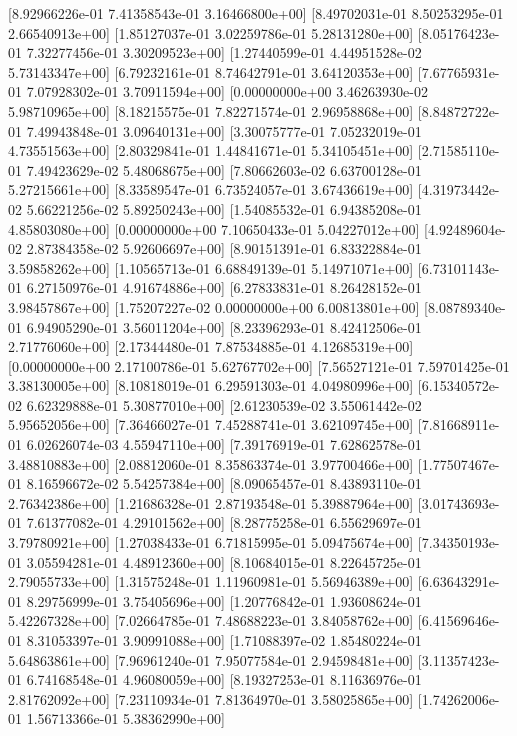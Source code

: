  [8.92966226e-01 7.41358543e-01 3.16466800e+00]
 [8.49702031e-01 8.50253295e-01 2.66540913e+00]
 [1.85127037e-01 3.02259786e-01 5.28131280e+00]
 [8.05176423e-01 7.32277456e-01 3.30209523e+00]
 [1.27440599e-01 4.44951528e-02 5.73143347e+00]
 [6.79232161e-01 8.74642791e-01 3.64120353e+00]
 [7.67765931e-01 7.07928302e-01 3.70911594e+00]
 [0.00000000e+00 3.46263930e-02 5.98710965e+00]
 [8.18215575e-01 7.82271574e-01 2.96958868e+00]
 [8.84872722e-01 7.49943848e-01 3.09640131e+00]
 [3.30075777e-01 7.05232019e-01 4.73551563e+00]
 [2.80329841e-01 1.44841671e-01 5.34105451e+00]
 [2.71585110e-01 7.49423629e-02 5.48068675e+00]
 [7.80662603e-02 6.63700128e-01 5.27215661e+00]
 [8.33589547e-01 6.73524057e-01 3.67436619e+00]
 [4.31973442e-02 5.66221256e-02 5.89250243e+00]
 [1.54085532e-01 6.94385208e-01 4.85803080e+00]
 [0.00000000e+00 7.10650433e-01 5.04227012e+00]
 [4.92489604e-02 2.87384358e-02 5.92606697e+00]
 [8.90151391e-01 6.83322884e-01 3.59858262e+00]
 [1.10565713e-01 6.68849139e-01 5.14971071e+00]
 [6.73101143e-01 6.27150976e-01 4.91674886e+00]
 [6.27833831e-01 8.26428152e-01 3.98457867e+00]
 [1.75207227e-02 0.00000000e+00 6.00813801e+00]
 [8.08789340e-01 6.94905290e-01 3.56011204e+00]
 [8.23396293e-01 8.42412506e-01 2.71776060e+00]
 [2.17344480e-01 7.87534885e-01 4.12685319e+00]
 [0.00000000e+00 2.17100786e-01 5.62767702e+00]
 [7.56527121e-01 7.59701425e-01 3.38130005e+00]
 [8.10818019e-01 6.29591303e-01 4.04980996e+00]
 [6.15340572e-02 6.62329888e-01 5.30877010e+00]
 [2.61230539e-02 3.55061442e-02 5.95652056e+00]
 [7.36466027e-01 7.45288741e-01 3.62109745e+00]
 [7.81668911e-01 6.02626074e-03 4.55947110e+00]
 [7.39176919e-01 7.62862578e-01 3.48810883e+00]
 [2.08812060e-01 8.35863374e-01 3.97700466e+00]
 [1.77507467e-01 8.16596672e-02 5.54257384e+00]
 [8.09065457e-01 8.43893110e-01 2.76342386e+00]
 [1.21686328e-01 2.87193548e-01 5.39887964e+00]
 [3.01743693e-01 7.61377082e-01 4.29101562e+00]
 [8.28775258e-01 6.55629697e-01 3.79780921e+00]
 [1.27038433e-01 6.71815995e-01 5.09475674e+00]
 [7.34350193e-01 3.05594281e-01 4.48912360e+00]
 [8.10684015e-01 8.22645725e-01 2.79055733e+00]
 [1.31575248e-01 1.11960981e-01 5.56946389e+00]
 [6.63643291e-01 8.29756999e-01 3.75405696e+00]
 [1.20776842e-01 1.93608624e-01 5.42267328e+00]
 [7.02664785e-01 7.48688223e-01 3.84058762e+00]
 [6.41569646e-01 8.31053397e-01 3.90991088e+00]
 [1.71088397e-02 1.85480224e-01 5.64863861e+00]
 [7.96961240e-01 7.95077584e-01 2.94598481e+00]
 [3.11357423e-01 6.74168548e-01 4.96080059e+00]
 [8.19327253e-01 8.11636976e-01 2.81762092e+00]
 [7.23110934e-01 7.81364970e-01 3.58025865e+00]
 [1.74262006e-01 1.56713366e-01 5.38362990e+00]
